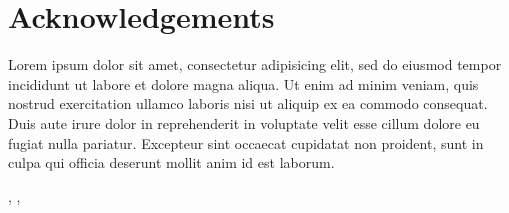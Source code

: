 \thispagestyle{plain}           %
\section*{Acknowledgements}
Lorem ipsum dolor sit amet, consectetur adipisicing elit, sed do eiusmod tempor incididunt ut labore et dolore magna aliqua. Ut enim ad minim veniam, quis nostrud exercitation ullamco laboris nisi ut aliquip ex ea commodo consequat. Duis aute irure dolor in reprehenderit in voluptate velit esse cillum dolore eu fugiat nulla pariatur. Excepteur sint occaecat cupidatat non proident, sunt in culpa qui officia deserunt mollit anim id est laborum.

\hfill
\thesisAuthor, \thesisCity, \thesisMonth\ \thesisYear

\if{}
\newpage                %
\thispagestyle{empty}
\mbox{}
\fi
